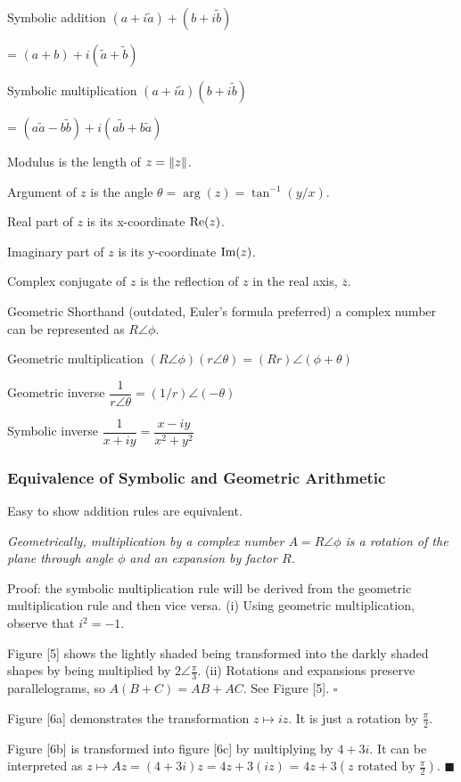 \begin{card}
    \begin{compactdesc}
    \item[Symbolic addition]
        $(a + i\tilde{a}) + (b + i\tilde{b})$

        = $(a + b) + i(\tilde{a} + \tilde{b})$
    \item[Symbolic multiplication]
        $(a + i\tilde{a}) (b + i\tilde{b})$

        = $(a\tilde{a} - b\tilde{b}) + i(a\tilde{b} + b\tilde{a})$
    \item[Modulus] is the length of $z = \lVert z\rVert$.
    \item[Argument] of $z$ is the angle $\theta = \arg(z) = \tan^{-1}(y/x)$.
    \item[Real part] of $z$ is its x-coordinate $\text{Re}(z)$.
    \item[Imaginary part] of $z$ is its y-coordinate $\text{Im}(z)$.
    \item[Complex conjugate] of $z$ is the reflection of $z$ in the real axis,
        $\overline z$.
    \item[Geometric Shorthand] (outdated, Euler's formula preferred)
        a complex number can be represented as $R \angle \phi$.
    \item[Geometric multiplication] $(R \angle \phi)(r \angle \theta) = (Rr) \angle (\phi + \theta)$
    \item[Geometric inverse] $\dfrac{1}{r \angle \theta} = (1/r) \angle (-\theta)$
    \item[Symbolic inverse] $\dfrac{1}{x + iy} = \dfrac{x - iy}{x^2 + y^2}$
    \end{compactdesc}
\end{card}

\begin{card}
\subsubsection{Equivalence of Symbolic and Geometric Arithmetic}

Easy to show addition rules are equivalent.

\textsl{Geometrically, multiplication by a complex number $A = R\angle\phi$
is a rotation of the plane through angle $\phi$ and an expansion by factor
$R$.}

Proof: the symbolic multiplication rule will be derived
from the geometric multiplication rule and
then vice versa. (i) Using geometric multiplication,
observe that $i^2 = -1$.

Figure [5] shows the lightly shaded being transformed into the darkly shaded shapes
by being multiplied by $2 \angle \frac{\pi}{3}$.
(ii) Rotations and expansions preserve parallelograms, so $A(B + C) = AB + AC$.
See Figure [5]. $\square$
\vspace{1em}

Figure [6a] demonstrates the transformation $z \mapsto iz$.
It is just a rotation by $\frac{\pi}{2}$.

Figure [6b] is transformed into figure [6c] by multiplying by $4 + 3i$.
It can be interpreted as
$z \mapsto Az = (4 + 3i)z = 4z + 3(iz)$
= $4z + 3(z \text{ rotated by } \frac{\pi}{2})$.
$\blacksquare$
\end{card}

